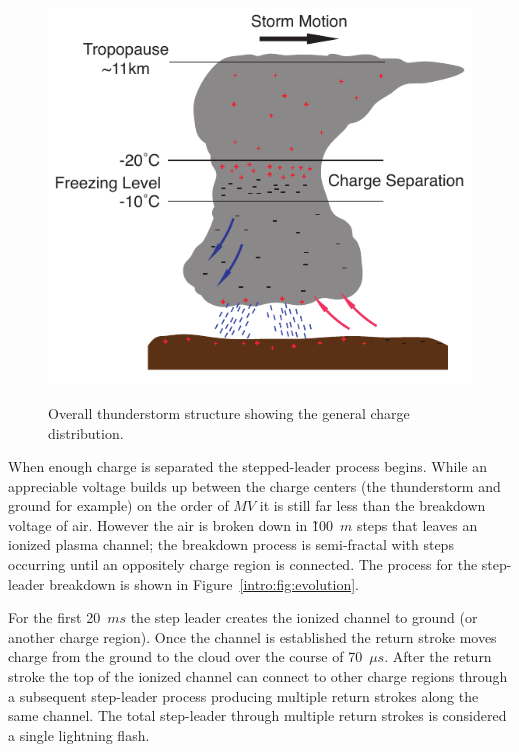 \begin{figure}[ht!]
	\centering
	\includegraphics[scale=1]{Introduction/Figures/Thunderstorm_Structure.pdf}\\
	\caption{Overall thunderstorm structure showing the general charge distribution.}
	\label{intro:fig:thunderstorm}
\end{figure}

When enough charge is separated the stepped-leader process begins.
While an appreciable voltage builds up between the charge centers (the thunderstorm and ground for example) on the order of $MV$ it is still far less than the breakdown voltage of air.
However the air is broken down in \~100~$m$ steps that leaves an ionized plasma channel; the breakdown process is semi-fractal with steps occurring until an oppositely charge region is connected.
The process for the step-leader breakdown is shown in Figure~\ref{intro:fig:evolution}.

For the first 20~$ms$ the step leader creates the ionized channel to ground (or another charge region).
Once the channel is established the return stroke moves charge from the ground to the cloud over the course of 70~$\mu s$.
After the return stroke the top of the ionized channel can connect to other charge regions through a subsequent step-leader process producing multiple return strokes along the same channel.
The total step-leader through multiple return strokes is considered a single lightning flash.


